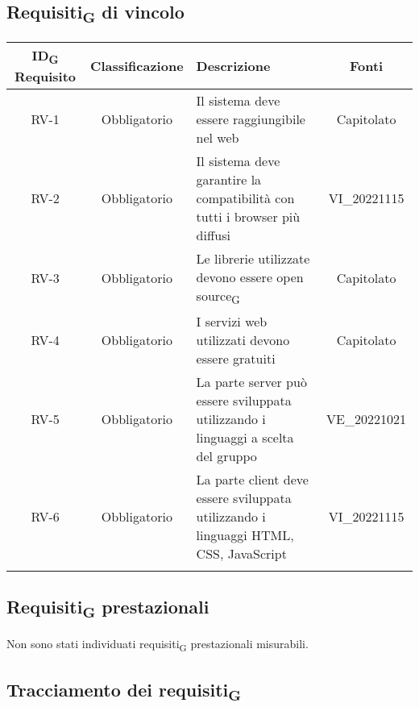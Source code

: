 \subsection{Requisiti\textsubscript{G} di vincolo}
\renewcommand\tabularxcolumn[1]{>{\Centering}m{#1}}
\begin{tabularx}{\textwidth}{| c | c | X | c |} 
 \hline
 \textbf{ID\textsubscript{G} Requisito} & \textbf{Classificazione} & \textbf{Descrizione} & \textbf{Fonti} \\
 \hline
 RV-1 & Obbligatorio &  Il sistema deve essere raggiungibile nel web & Capitolato\\
 \hline
  RV-2 & Obbligatorio & Il sistema deve garantire la compatibilità con tutti i browser più diffusi & VI\_20221115\\
 \hline
 RV-3 & Obbligatorio &  Le librerie utilizzate devono essere open source\textsubscript{G} & Capitolato\\
 \hline
 RV-4 & Obbligatorio & I servizi web utilizzati devono essere gratuiti &  Capitolato\\
 \hline
 RV-5 & Obbligatorio & La parte server può essere sviluppata utilizzando i linguaggi a scelta del gruppo & VE\_20221021\\
 \hline
 RV-6 & Obbligatorio & La parte client deve essere sviluppata utilizzando i linguaggi HTML, CSS, JavaScript & VI\_20221115\\
 \hline
 \caption{Requisiti\textsubscript{G} di vincolo}
\end{tabularx}

\subsection{Requisiti\textsubscript{G} prestazionali}
Non sono stati individuati requisiti\textsubscript{G} prestazionali misurabili.

\subsection{Tracciamento dei requisiti\textsubscript{G}}

